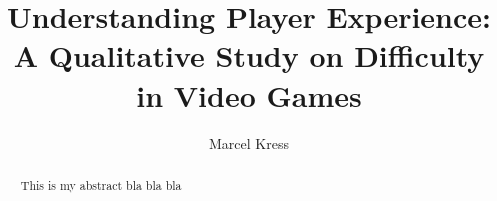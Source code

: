 \documentclass[acmlarge]{acmart}
\begin{document}
\title{Understanding Player Experience: A Qualitative Study on Difficulty in Video Games}
\author{Marcel Kress}
\begin{abstract}
This is my abstract bla bla bla
\end{abstract}

\maketitle





\end{document}
